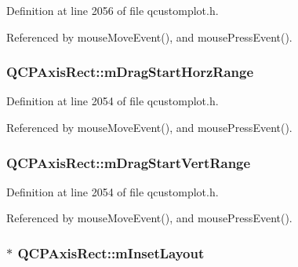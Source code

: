 Definition at line 2056 of file qcustomplot.\+h.



Referenced by mouse\+Move\+Event(), and mouse\+Press\+Event().

\hypertarget{class_q_c_p_axis_rect_a41936cf473ec638bec382f5a40cdb1f3}{}
\subsubsection[{m\+Drag\+Start\+Horz\+Range}]{ Q\+C\+P\+Axis\+Rect\+::m\+Drag\+Start\+Horz\+Range\hspace{0.3cm}{\ttfamily [protected]}}\label{class_q_c_p_axis_rect_a41936cf473ec638bec382f5a40cdb1f3}


Definition at line 2054 of file qcustomplot.\+h.



Referenced by mouse\+Move\+Event(), and mouse\+Press\+Event().

\hypertarget{class_q_c_p_axis_rect_a1a5ae4c74b8bd46baf91bf4e4f4165f0}{}
\subsubsection[{m\+Drag\+Start\+Vert\+Range}]{ Q\+C\+P\+Axis\+Rect\+::m\+Drag\+Start\+Vert\+Range\hspace{0.3cm}{\ttfamily [protected]}}\label{class_q_c_p_axis_rect_a1a5ae4c74b8bd46baf91bf4e4f4165f0}


Definition at line 2054 of file qcustomplot.\+h.



Referenced by mouse\+Move\+Event(), and mouse\+Press\+Event().

\hypertarget{class_q_c_p_axis_rect_a255240399e0fd24baad80cbbe46f698a}{}
\subsubsection[{m\+Inset\+Layout}]{$\ast$ Q\+C\+P\+Axis\+Rect\+::m\+Inset\+Layout\hspace{0.3cm}{\ttfamily [protected]}}\label{class_q_c_p_axis_rect_a255240399e0fd24baad80cbbe46f698a}


